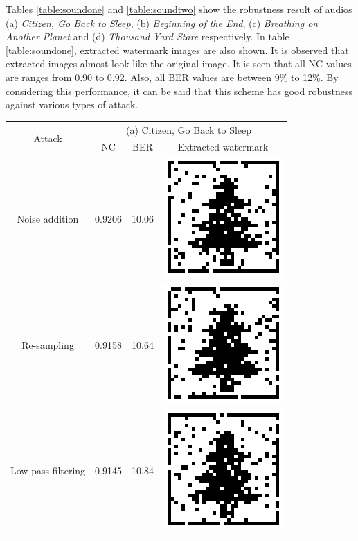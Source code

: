 \documentclass[12pt,a4paper]{report}
\begin{document}
\bigskip

Tables \ref{table:soundone} and \ref{table:soundtwo} show the robustness result of audios (a) \textit{Citizen, Go Back to Sleep}, (b) \textit{Beginning of the End}, (c) \textit{Breathing on Another Planet} and (d) \textit{Thousand Yard Stare} respectively. In table \ref{table:soundone}, extracted watermark images are also shown. It is observed that extracted images almost look like the original image. It is seen that all NC values are ranges from 0.90 to 0.92. Also, all BER values are between 9\% to 12\%. By considering this performance, it can be said that this scheme has good robustness against various types of attack.


\begin{table}[h!]
 \centering
 \begin{tabular} {|c|c|c|c|} 
 \hline
 \multirow{2}{*}{Attack} & \multicolumn{3}{|c|}{(a) Citizen, Go Back to Sleep} \\
 \cline{2-4}
  & NC & BER & Extracted watermark \\
 \hline
 Noise addition	& 0.9206 & 10.06 & \includegraphics[scale=.4]{image/citizen(awgn).png} \\
  \hline
 Re-sampling & 0.9158 & 10.64 & \includegraphics[scale=.4]{image/citizen(resampling).png} \\
  \hline
 Low-pass filtering & 0.9145 & 10.84 & \includegraphics[scale=.4]{image/citizen(lpf).png} \\

\end{tabular}
\end{table}
\end{document}
